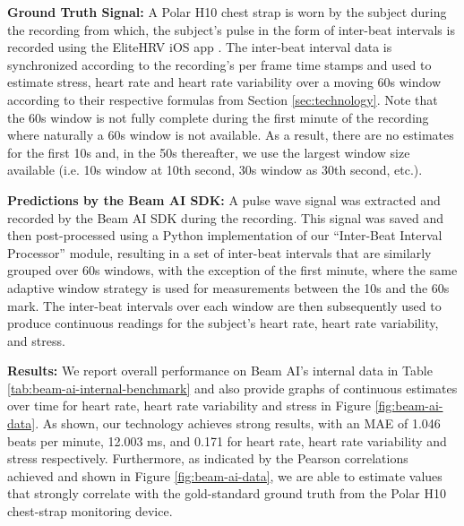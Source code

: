 \documentclass{article}
\begin{document}
\textbf{Ground Truth Signal:} A Polar H10 chest strap is worn by the subject during the recording from which, the subject's pulse in the form of inter-beat intervals is recorded using the EliteHRV iOS app \cite{elite_hrv_2022}. The inter-beat interval data is synchronized according to the recording's per frame time stamps and used to estimate stress, heart rate and heart rate variability over a moving 60s window according to their respective formulas from Section \ref{sec:technology}. Note that the 60s window is not fully complete during the first minute of the recording where naturally a 60s window is not available. As a result, there are no estimates for the first 10s and, in the 50s thereafter, we use the largest window size available (i.e. 10s window at 10th second, 30s window as 30th second, etc.).

\textbf{Predictions by the Beam AI SDK:} A pulse wave signal was extracted and recorded by the Beam AI SDK during the recording. This signal was saved and then post-processed using a Python implementation of our ``Inter-Beat Interval Processor'' module, resulting in a set of inter-beat intervals that are similarly grouped over 60s windows, with the exception of the first minute, where the same adaptive window strategy is used for measurements between the 10s and the 60s mark. The inter-beat intervals over each window are then subsequently used to produce continuous readings for the subject's heart rate, heart rate variability, and stress.

\textbf{Results:} We report overall performance on Beam AI's internal data in Table \ref{tab:beam-ai-internal-benchmark} and also provide graphs of continuous estimates over time for heart rate, heart rate variability and stress in Figure \ref{fig:beam-ai-data}. As shown, our technology achieves strong results, with an MAE of 1.046 beats per minute, 12.003 ms, and 0.171 for heart rate, heart rate variability and stress respectively. Furthermore, as indicated by the Pearson correlations achieved and shown in Figure \ref{fig:beam-ai-data}, we are able to estimate values that strongly correlate with the gold-standard ground truth from the Polar H10 chest-strap monitoring device.
\end{document}
